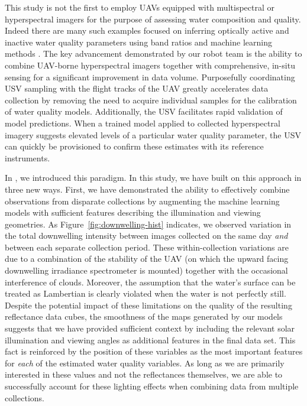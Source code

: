 \documentclass[remotesensing,article,submit,pdftex,moreauthors]{Definitions/mdpi}
\begin{document}
This study is not the first to employ UAVs equipped with multispectral or hyperspectral imagers for the purpose of assessing water composition and quality. Indeed there are many such examples focused on inferring optically active and inactive water quality parameters using band ratios and machine learning methods \cite{vogt2016near,lu2021retrieval, zhang2022selection}. The key advancement demonstrated by our robot team is the ability to combine UAV-borne hyperspectral imagers together with comprehensive, in-situ sensing for a significant improvement in data volume. Purposefully coordinating USV sampling with the flight tracks of the UAV greatly accelerates data collection by removing the need to acquire individual samples for the calibration of water quality models. Additionally, the USV facilitates rapid validation of model predictions. When a trained model applied to collected hyperspectral imagery suggests elevated levels of a particular water quality parameter, the USV can quickly be provisioned to confirm these estimates with its reference instruments. 

In \cite{robotTeam1}, we introduced this paradigm. In this study, we have built on this approach in three new ways. First, we have demonstrated the ability to effectively combine observations from disparate collections by augmenting the machine learning models with sufficient features describing the illumination and viewing geometries. As Figure~\ref{fig:downwelling-hist} indicates, we observed variation in the total downwelling intensity between images collected on the same day \textit{and} between each separate collection period. These within-collection variations are due to a combination of the stability of the UAV (on which the upward facing downwelling irradiance spectrometer is mounted) together with the occasional interference of clouds. Moreover, the assumption that the water's surface can be treated as Lambertian is clearly violated when the water is not perfectly still. Despite the potential impact of these limitations on the quality of the resulting reflectance data cubes, the smoothness of the maps generated by our models suggests that we have provided sufficient context by including the relevant solar illumination and viewing angles as additional features in the final data set.  This fact is reinforced by the position of these variables as the most important features for \textit{each} of the estimated water quality variables. As long as we are primarily interested in these values and not the reflectances themselves, we are able to successfully account for these lighting effects when combining data from multiple collections.
\end{document}
